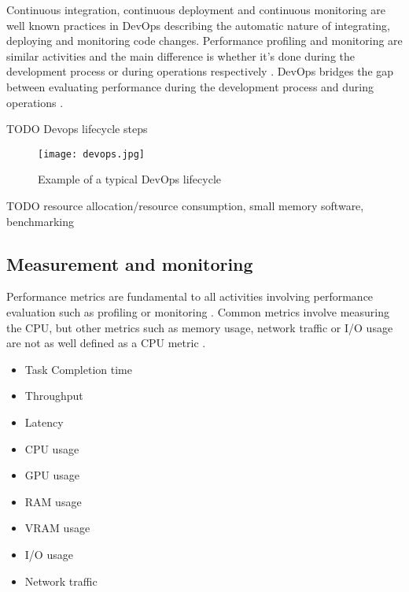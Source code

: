 

Continuous integration, continuous deployment and continuous monitoring are well known practices in DevOps \parencite{wallerIncludingPerformanceBenchmarks2015} describing the automatic nature of integrating, deploying and monitoring code changes. Performance profiling and monitoring are similar activities and the main difference is whether it's done during the development process or during operations respectively \parencite{wallerIncludingPerformanceBenchmarks2015}. DevOps bridges the gap between evaluating performance during the development process and during operations \parencite{brunnertPerformanceorientedDevOpsResearch2015}.

TODO Devops lifecycle steps

\begin{figure}[h]
    \centering
    \texttt{[image: devops.jpg]}
    \caption{Example of a typical DevOps lifecycle}
    \label{fig:devops}
\end{figure}


TODO resource allocation/resource consumption, small memory software, benchmarking

\subsection{Measurement and monitoring}

Performance metrics are fundamental to all activities involving performance evaluation such as profiling or monitoring \parencite{brunnertPerformanceorientedDevOpsResearch2015}. Common metrics involve measuring the CPU, but other metrics such as memory usage, network traffic or I/O usage are not as well defined as a CPU metric \parencite{brunnertPerformanceorientedDevOpsResearch2015}.

\begin{itemize}
    \item Task Completion time
    \item Throughput
    \item Latency
    \item CPU usage
    \item GPU usage
    \item RAM usage
    \item VRAM usage
    \item I/O usage
    \item Network traffic
\end{itemize}

